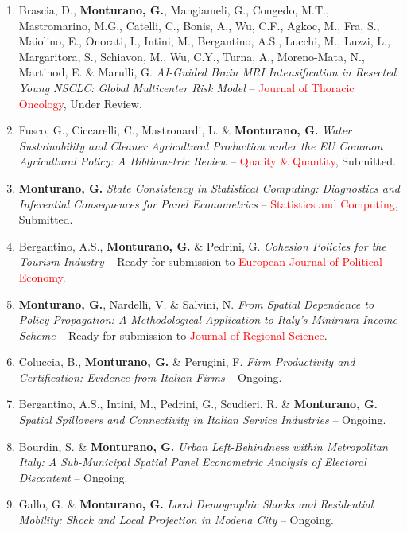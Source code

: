 \documentclass[11pt,a4paper,sans]{moderncv} %
\begin{document}
\begin{enumerate}
\item Brascia, D., \textbf{Monturano, G.},
Mangiameli, G., Congedo, M.T., Mastromarino, M.G.,
Catelli, C., Bonis, A., Wu, C.F., Agkoc, M.,
Fra, S., Maiolino, E., Onorati, I., Intini, M.,
Bergantino, A.S., Lucchi, M., Luzzi, L.,
Margaritora, S., Schiavon, M., Wu, C.Y.,
Turna, A., Moreno-Mata, N., Martinod, E.
\& Marulli, G.
\textit{AI-Guided Brain MRI Intensification in
Resected Young NSCLC: Global Multicenter Risk Model}
-- \textcolor{red}{Journal of Thoracic Oncology},
Under Review.


\item Fusco, G., Ciccarelli, C.,
Mastronardi, L. \& \textbf{Monturano, G.}
\textit{Water Sustainability and Cleaner Agricultural
Production under the EU Common Agricultural Policy:
A Bibliometric Review}
-- \textcolor{red}{Quality \& Quantity},
Submitted.

\item \textbf{Monturano, G.}
\textit{State Consistency in Statistical Computing:
Diagnostics and Inferential Consequences for Panel Econometrics}
-- \textcolor{red}{Statistics and Computing},
Submitted.


\item Bergantino, A.S., \textbf{Monturano, G.} \& Pedrini, G.
\textit{Cohesion Policies for the Tourism Industry}
-- Ready for submission to
\textcolor{red}{European Journal of Political Economy}.


\item \textbf{Monturano, G.}, Nardelli, V.
\& Salvini, N.
\textit{From Spatial Dependence to Policy Propagation:
A Methodological Application to Italy's Minimum Income Scheme}
-- Ready for submission to
\textcolor{red}{Journal of Regional Science}.


\item Coluccia, B., \textbf{Monturano, G.}
\& Perugini, F.
\textit{Firm Productivity and Certification:
Evidence from Italian Firms}
-- Ongoing.

\item Bergantino, A.S., Intini, M., Pedrini, G.,
Scudieri, R. \& \textbf{Monturano, G.}
\textit{Spatial Spillovers and Connectivity
in Italian Service Industries}
-- Ongoing.

\item Bourdin, S. \& \textbf{Monturano, G.}
\textit{Urban Left-Behindness within Metropolitan Italy:
A Sub-Municipal Spatial Panel Econometric Analysis
of Electoral Discontent}
-- Ongoing.

\item Gallo, G. \& \textbf{Monturano, G.}
\textit{Local Demographic Shocks and Residential Mobility:
Shock and Local Projection in Modena City}
-- Ongoing.

\end{enumerate}
\end{document}
